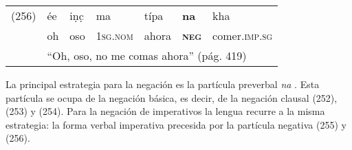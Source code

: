 {%
\begin{tabular}{lllllll}
(256) & ée & iṇc̣ & ma & típa & \textbf{na} & kha \\
& oh & oso & \textsc{1sg.nom} & ahora & \textsc{\textbf{neg}} & comer.\textsc{imp.sg} \\
& \multicolumn{6}{l}{``Oh, oso, no me comas ahora'' (pág. 419)}
\end{tabular} \vspace{0.5cm}

}

La principal estrategia para la negación es la partícula preverbal {\setmainfont{Charis SIL} \textit{na}} \textcolor{MidnightBlue}{\citep{palula}}. Esta partícula se ocupa de la negación básica, es decir, de la negación clausal (252), (253) y (254). Para la negación de imperativos la lengua recurre a la misma estrategia: la forma verbal imperativa precesida por la partícula negativa (255) y (256).